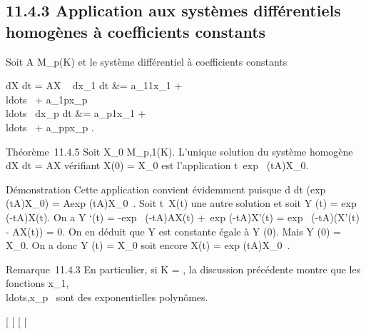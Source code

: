 \documentclass[]{article}
\begin{document}
\subsection{11.4.3 Application aux systèmes différentiels homogènes à
coefficients constants}

Soit A \in M_p(K) et le système différentiel à coefficients
constants

 dX \over dt = AX \Leftrightarrow
\left \ \cases 
dx_1 \over dt &= a_11x_1 +
\\ldots~ +
a_1px_p \cr
\\ldots~
\cr  dx_p \over dt &=
a_p1x_1 +
\\ldots~ +
a_ppx_p  \right .

Théorème~11.4.5 Soit X_0 \in M_p,1(K). L'unique solution
du système homogène  dX \over dt = AX vérifiant X(0)
= X_0 est l'application
t\mapsto~exp~
(tA)X_0.

Démonstration Cette application convient évidemment puisque  d
\over dt (exp~
(tA)X_0) = Aexp (tA)X_0~.
Soit t\mapsto~X(t) une autre solution et soit Y (t)
= exp~ (-tA)X(t). On a Y `(t) =
-exp~ (-tA)AX(t) +\
exp (-tA)X'(t) = exp~ (-tA)(X'(t) - AX(t)) =
0. On en déduit que Y est constante égale à Y (0). Mais Y (0) =
X_0. On a donc Y (t) = X_0 soit encore X(t)
= exp (tA)X_0~.

Remarque~11.4.3 En particulier, si K = , la discussion précédente
montre que les fonctions
x_1,\\ldots,x_p~
sont des exponentielles polynômes.

[
[
[
[
\end{document}
